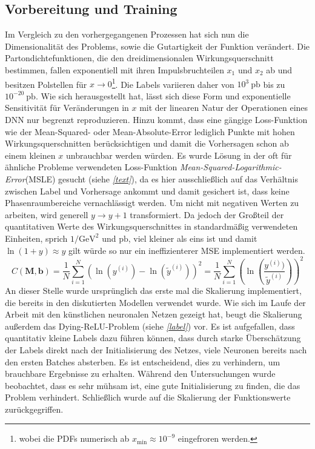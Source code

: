 \subsection{Vorbereitung und Training}
Im Vergleich zu den vorhergegangenen Prozessen hat sich nun die Dimensionalität des Problems, sowie die Gutartigkeit der Funktion verändert. Die Partondichtefunktionen, die den dreidimensionalen Wirkungsquerschnitt bestimmen, fallen exponentiell mit ihren Impulsbruchteilen $x_1$ und $x_2$ ab und besitzen Polstellen für $x \rightarrow 0$\footnote{wobei die PDFs numerisch ab $x_{\text{min}} \approx 10^{-9}$ eingefroren werden.}. Die Labels variieren daher von $10^{3}~\text{pb}$ bis zu $10^{-20}~\text{pb}$. Wie sich herausgestellt hat, lässt sich diese Form und exponentielle Sensitivität für Veränderungen in $x$ mit der linearen Natur der Operationen eines DNN nur begrenzt reproduzieren. Hinzu kommt, dass eine gängige Loss-Funktion wie der Mean-Squared- oder Mean-Absolute-Error lediglich Punkte mit hohen Wirkungsquerschnitten berücksichtigen und damit die Vorhersagen schon ab einem kleinen $x$ unbrauchbar werden würden. Es wurde Lösung in der oft für ähnliche Probleme verwendeten Loss-Funktion \textit{Mean-Squared-Logarithmic-Error}(MSLE) gesucht (siehe \textit{\autoref{text}}), da es hier ausschließlich auf das Verhältnis zwischen Label und Vorhersage ankommt und damit gesichert ist, dass keine Phasenraumbereiche vernachlässigt werden. Um nicht mit negativen Werten zu arbeiten, wird generell $y \rightarrow y + 1$ transformiert. Da jedoch der Großteil der quantitativen Werte des Wirkungsquerschnittes in standardmäßig verwendeten Einheiten, sprich $1/\text{GeV}^2$ und $\text{pb}$, viel kleiner als eins ist und damit $\ln(1+y) \approx y$ gilt würde so nur ein ineffizienterer MSE implementiert werden. 
\begin{equation}
C\left(\mathbf{M}, \mathbf{b}\right) = \frac{1}{N} \sum_{i=1}^{N} \left(\ln(y^{(i)}) - \ln(\tilde{y}^{(i)})\right)^2 = \frac{1}{N} \sum_{i=1}^{N} \left(\ln(\frac{y^{(i)})}{\tilde{y}^{(i)}})\right)^2
\end{equation}
An dieser Stelle wurde ursprünglich das erste mal die Skalierung implementiert, die bereits in den diskutierten Modellen verwendet wurde. Wie sich im Laufe der Arbeit mit den künstlichen neuronalen Netzen gezeigt hat, beugt die Skalierung außerdem das Dying-ReLU-Problem (siehe \textit{\autoref{label}}) vor. Es ist aufgefallen, dass quantitativ kleine Labels dazu führen können, dass durch starke Überschätzung der Labels direkt nach der Initialisierung des Netzes, viele Neuronen bereits nach den ersten Batches absterben. Es ist entscheidend, dies zu verhindern, um brauchbare Ergebnisse zu erhalten. Während den Untersuchungen wurde beobachtet, dass es sehr mühsam ist, eine gute Initialisierung zu finden, die das Problem verhindert. Schließlich wurde auf die Skalierung der Funktionswerte zurückgegriffen.

